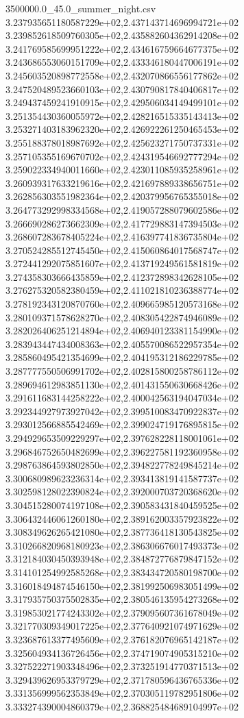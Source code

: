 \begin{filecontents*}{3500000.0_45.0_summer_night.csv}
3.237935651180587229e+02,2.437143714696994721e+02
3.239852618509760305e+02,2.435882604362914208e+02
3.241769585699951222e+02,2.434616759664677375e+02
3.243686553060151709e+02,2.433346180447006191e+02
3.245603520898772558e+02,2.432070866556177862e+02
3.247520489523660103e+02,2.430790817840406817e+02
3.249437459241910915e+02,2.429506034149499101e+02
3.251354430360055972e+02,2.428216515335143413e+02
3.253271403183962320e+02,2.426922261250465453e+02
3.255188378018987692e+02,2.425623271750737331e+02
3.257105355169670702e+02,2.424319546692777294e+02
3.259022334940011660e+02,2.423011085935258961e+02
3.260939317633219616e+02,2.421697889338656751e+02
3.262856303551982364e+02,2.420379956765355018e+02
3.264773292998334568e+02,2.419057288079602586e+02
3.266690286273662309e+02,2.417729883147394503e+02
3.268607283678405224e+02,2.416397741836735804e+02
3.270524285512745450e+02,2.415060864017568747e+02
3.272441292075851607e+02,2.413719249561581819e+02
3.274358303666435859e+02,2.412372898342628105e+02
3.276275320582380459e+02,2.411021810236388774e+02
3.278192343120870760e+02,2.409665985120573168e+02
3.280109371578628270e+02,2.408305422874946089e+02
3.282026406251214894e+02,2.406940123381154990e+02
3.283943447434008363e+02,2.405570086522957354e+02
3.285860495421354699e+02,2.404195312186229785e+02
3.287777550506991702e+02,2.402815800258786112e+02
3.289694612983851130e+02,2.401431550630668426e+02
3.291611683144258222e+02,2.400042563194047034e+02
3.292344927973927042e+02,2.399510083470922837e+02
3.293012566885542469e+02,2.399024719176895815e+02
3.294929653509229297e+02,2.397628228118001061e+02
3.296846752650482699e+02,2.396227581192360958e+02
3.298763864593802850e+02,2.394822778249845214e+02
3.300680989623236314e+02,2.393413819141587737e+02
3.302598128022390824e+02,2.392000703720368620e+02
3.304515280074197108e+02,2.390583431840459525e+02
3.306432446061260180e+02,2.389162003357923822e+02
3.308349626265421080e+02,2.387736418130543825e+02
3.310266820968180923e+02,2.386306676017493373e+02
3.312184030450393948e+02,2.384872776879847152e+02
3.314101254992585268e+02,2.383434720580198700e+02
3.316018494874546150e+02,2.381992506983051499e+02
3.317935750375502835e+02,2.380546135954273268e+02
3.319853021774243302e+02,2.379095607361678049e+02
3.321770309349017225e+02,2.377640921074971629e+02
3.323687613377495609e+02,2.376182076965142187e+02
3.325604934136726456e+02,2.374719074905315210e+02
3.327522271903348496e+02,2.373251914770371513e+02
3.329439626953379729e+02,2.371780596436765336e+02
3.331356999562353849e+02,2.370305119782951806e+02
3.333274390004860379e+02,2.368825484689104997e+02

\end{filecontents*}

